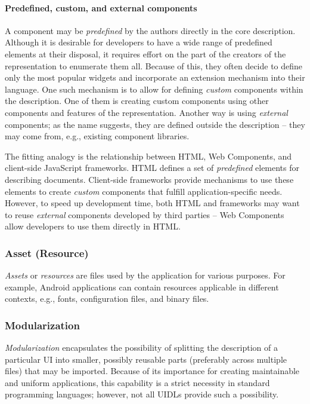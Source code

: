 \paragraph{Predefined, custom, and external components}
A component may be \emph{predefined} by the authors directly in the core description.
Although it is desirable for developers to have a wide range of predefined elements at their disposal, it requires effort on the part of the creators of the representation to enumerate them all.
Because of this, they often decide to define only the most popular widgets and incorporate an extension mechanism into their language.
One such mechanism is to allow for defining \emph{custom} components within the description.
One of them is creating custom components using other components and features of the representation.
Another way is using \emph{external} components;
as the name suggests, they are defined outside the description -- they may come from, e.g., existing component libraries.

The fitting analogy is the relationship between HTML, Web Components, and client-side JavaScript frameworks.
HTML defines a set of \emph{predefined} elements for describing documents.
Client-side frameworks provide mechanisms to use these elements to create \emph{custom} components that fulfill application-specific needs.
However, to speed up development time, both HTML and frameworks may want to reuse \emph{external} components developed by third parties -- Web Components allow developers to use them directly in HTML\@.

\subsubsection{Asset (Resource)}
\emph{Assets} or \emph{resources} are files used by the application for various purposes.
For example, Android applications can contain resources applicable in different contexts, e.g., fonts, configuration files, and binary files.

\subsubsection{Modularization}
\emph{Modularization} encapsulates the possibility of splitting the description of a particular UI into smaller, possibly reusable parts (preferably across multiple files) that may be imported.
Because of its importance for creating maintainable and uniform applications, this capability is a strict necessity in standard programming languages;
however, not all UIDLs provide such a possibility.

